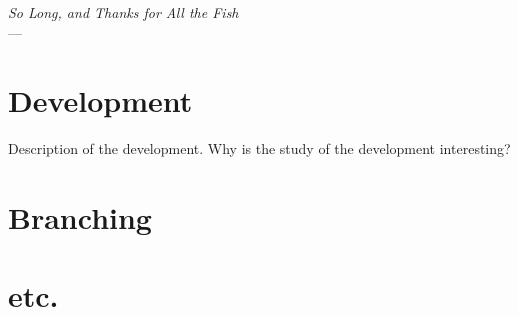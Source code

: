 \label{ch:lung}
\begin{flushright}{\slshape    
		So Long, and Thanks for All the Fish} \\ \medskip
    ---  \citep{Adams1984}
\end{flushright}
\lipsum[1]

\section{Development}
Description of the development. Why is the study of the development interesting?

\section{Branching}

\section{etc.}